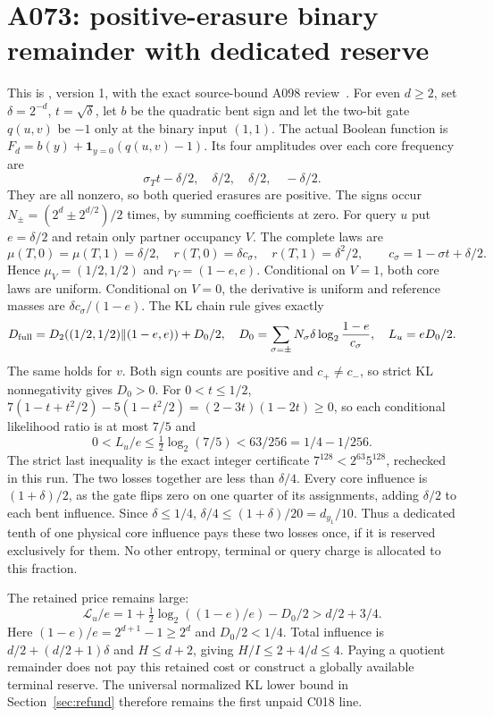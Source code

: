\documentclass[11pt]{article}
\begin{document}
\section{A073: positive-erasure binary remainder with dedicated reserve}
\label{sec:binary}
This is , version 1,
with the exact source-bound A098 review~\cite{A073d,A098d}.
For even $d\ge2$, set $\delta=2^{-d}$, $t=\sqrt\delta$, let $b$ be
the quadratic bent sign and let the two-bit gate $q(u,v)$ be $-1$ only
at the binary input $(1,1)$. The actual Boolean function is
$F_d=b(y)+\mathbf1_{y=0}(q(u,v)-1)$.
Its four amplitudes over each core frequency are
\[
 \sigma_Tt-\delta/2,\quad\delta/2,\quad\delta/2,\quad-\delta/2.
\]
They are all nonzero, so both queried erasures are positive. The signs
occur $N_\pm=(2^d\pm2^{d/2})/2$ times, by summing coefficients at zero.
For query $u$ put $e=\delta/2$ and retain only partner occupancy $V$.
The complete laws are
\[
 \mu(T,0)=\mu(T,1)=\delta/2,\quad
 r(T,0)=\delta c_\sigma,\quad r(T,1)=\delta^2/2,
 \qquad c_\sigma=1-\sigma t+\delta/2.
\]
Hence $\mu_V=(1/2,1/2)$ and $r_V=(1-e,e)$.
Conditional on $V=1$, both core laws are uniform. Conditional on $V=0$,
the derivative is uniform and reference masses are $\delta c_\sigma/(1-e)$.
The KL chain rule gives exactly
\[
 D_{\rm full}=D_2((1/2,1/2)\Vert(1-e,e))+D_0/2,
 \quad D_0=\sum_{\sigma=\pm}N_\sigma\delta
       \log_2\frac{1-e}{c_\sigma},\quad L_u=eD_0/2.
\]
The same holds for $v$. Both sign counts are positive and $c_+\ne c_-$,
so strict KL nonnegativity gives $D_0>0$.
For $0<t\le1/2$,
$7(1-t+t^2/2)-5(1-t^2/2)=(2-3t)(1-2t)\ge0$,
so each conditional likelihood ratio is at most $7/5$ and
\[
 0<L_u/e\le\tfrac12\log_2(7/5)<63/256=1/4-1/256.
\]
The strict last inequality is the exact integer certificate
$7^{128}<2^{63}5^{128}$, rechecked in this run.
The two losses together are less than $\delta/4$.
Every core influence is $(1+\delta)/2$, as the gate flips zero on one
quarter of its assignments, adding $\delta/2$ to each bent influence.
Since $\delta\le1/4$, $\delta/4\le(1+\delta)/20=d_{y_1}/10$.
Thus a dedicated tenth of one physical core influence pays these two
losses once, if it is reserved exclusively for them. No other entropy,
terminal or query charge is allocated to this fraction.

The retained price remains large:
\[
 \mathcal L_u/e=1+\tfrac12\log_2((1-e)/e)-D_0/2>d/2+3/4.
\]
Here $(1-e)/e=2^{d+1}-1\ge2^d$ and $D_0/2<1/4$.
Total influence is $d/2+(d/2+1)\delta$ and $H\le d+2$,
giving $H/I\le2+4/d\le4$. Paying a quotient remainder does not pay
this retained cost or construct a globally available terminal reserve.
The universal normalized KL lower bound in Section~\ref{sec:refund}
therefore remains the first unpaid C018 line.
\end{document}
